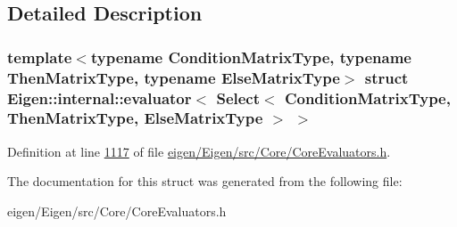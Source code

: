 \subsection{Detailed Description}
\subsubsection*{template$<$typename Condition\+Matrix\+Type, typename Then\+Matrix\+Type, typename Else\+Matrix\+Type$>$\newline
struct Eigen\+::internal\+::evaluator$<$ Select$<$ Condition\+Matrix\+Type, Then\+Matrix\+Type, Else\+Matrix\+Type $>$ $>$}



Definition at line \hyperlink{eigen_2_eigen_2src_2_core_2_core_evaluators_8h_source_l01117}{1117} of file \hyperlink{eigen_2_eigen_2src_2_core_2_core_evaluators_8h_source}{eigen/\+Eigen/src/\+Core/\+Core\+Evaluators.\+h}.



The documentation for this struct was generated from the following file\+:\begin{DoxyCompactItemize}
\item 
eigen/\+Eigen/src/\+Core/\+Core\+Evaluators.\+h\end{DoxyCompactItemize}
